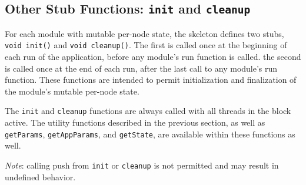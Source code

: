 \documentclass[11pt]{article}
\begin{document}
\subsection{Other Stub Functions: \texttt{init} and \texttt{cleanup}}

For each module with mutable per-node state, the skeleton defines two
stubs, \texttt{void init()} and \texttt{void cleanup()}.  The first is
called once at the beginning of each run of the application, before
any module's run function is called.  the second is called once at the
end of each run, after the last call to any module's run
function. These functions are intended to permit initialization and
finalization of the module's mutable per-node state.

The \texttt{init} and \texttt{cleanup} functions are always called
with all threads in the block active.  The utility functions described
in the previous section, as well as \texttt{getParams},
\texttt{getAppParams}, and \texttt{getState}, are available within
these functions as well.

\emph{Note}: calling push from \texttt{init} or \texttt{cleanup} is
not permitted and may result in undefined behavior.
\end{document}
